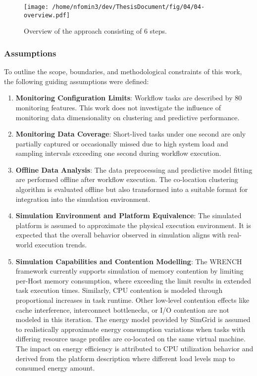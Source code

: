 \begin{figure}[htbp]
    \centering
    \texttt{[image: /home/nfomin3/dev/ThesisDocument/fig/04/04-overview.pdf]} %
    \caption{Overview of the approach consisting of 6 steps.}
    \label{fig:approach_overview}
\end{figure}

\subsubsection{Assumptions}
\label{sec:assumptions}
To outline the scope, boundaries, and methodological constraints of this work, the following guiding assumptions were defined:

\begin{enumerate}
    \item \textbf{Monitoring Configuration Limits}:  Workflow tasks are described by 80 monitoring features. This work does not investigate the influence of monitoring data dimensionality on clustering and predictive performance.
    \item \textbf{Monitoring Data Coverage}: Short-lived tasks under one second are only partially captured or occasionally missed due to high system load and sampling intervals exceeding one second during workflow execution.
    \item \textbf{Offline Data Analysis}: The data preprocessing and predictive model fitting are performed offline after workflow execution. The co-location clustering algorithm is evaluated offline but also transformed into a suitable format for integration into the simulation environment.
    \item \textbf{Simulation Environment and Platform Equivalence}: The simulated platform is assumed to approximate the physical execution environment. It is expected that the overall behavior observed in simulation aligns with real-world execution trends.
    \item \textbf{Simulation Capabilities and Contention Modelling}: The WRENCH framework currently supports simulation of memory contention by limiting per-Host memory consumption, where exceeding the limit results in extended task execution times. Similarly, CPU contention is modeled through proportional increases in task runtime. Other low-level contention effects like cache interference, interconnect bottlenecks, or I/O contention are not modeled in this iteration. The energy model provided by SimGrid is assumed to realistically approximate energy consumption variations when tasks with differing resource usage profiles are co-located on the same virtual machine. The impact on energy efficiency is attributed to CPU utilization behavior and derived from the platform description where different load levels map to consumed energy amount.
\end{enumerate}

